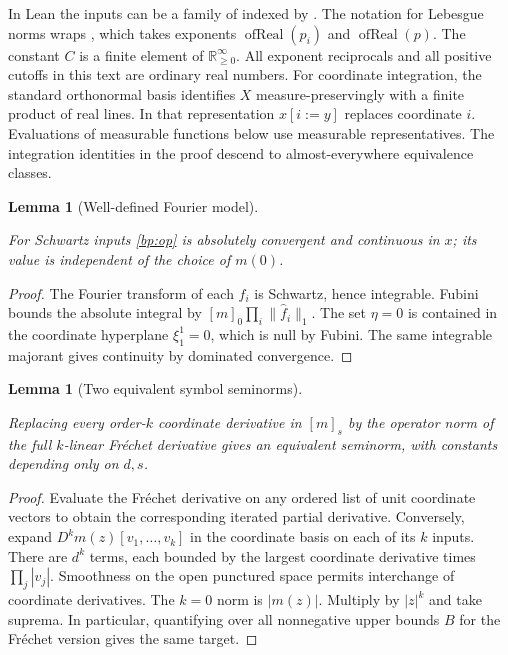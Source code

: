\documentclass[11pt,letterpaper]{article}
\newtheorem{lemma}[theorem]{Lemma}
\theoremstyle{definition}
\newcommand{\norm}[1]{\lVert#1\rVert}
\newcommand{\code}[1]{\texttt{\detokenize{#1}}}
\providecommand{\lean}[1]{}
\begin{document}
In Lean the
inputs can be a family of \code{SchwartzMap} indexed by \code{Fin d}.
The notation for Lebesgue norms wraps \code{eLpNorm}, which takes
exponents \(\operatorname{ofReal}(p_i)\) and
\(\operatorname{ofReal}(p)\). The constant \(C\) is a finite element
of \(\mathbb R_{\ge0}^{\infty}\).
All exponent reciprocals and all positive cutoffs in this text are
ordinary real numbers. For coordinate integration, the standard
orthonormal basis identifies \(X\) measure-preservingly with a finite
product of real lines. In that representation \(x[i:=y]\) replaces
coordinate \(i\). Evaluations of measurable functions below use
measurable representatives. The integration identities in the proof
descend to almost-everywhere equivalence classes.

\begin{lemma}[Well-defined Fourier model]\label{bp:schwartz-Fourier}
\lean{TwistedParaproduct.schwartzFourier}
For Schwartz inputs \eqref{bp:op} is absolutely convergent and
continuous in \(x\); its value is independent of the choice of \(m(0)\).
\end{lemma}
\begin{proof}
The Fourier transform of each \(f_i\) is Schwartz, hence integrable.
Fubini bounds the absolute integral by
\([m]_0\prod_i\norm{\widehat f_i}_1\). The set \(\eta=0\) is contained
in the coordinate hyperplane \(\xi^1_1=0\), which is null by Fubini.
The same integrable majorant gives continuity by dominated convergence.
\end{proof}

\begin{lemma}[Two equivalent symbol seminorms]\label{bp:frechet}
\lean{TwistedParaproduct.frechet}
Replacing every order-\(k\) coordinate derivative in \([m]_s\) by the
operator norm of the full \(k\)-linear Fr\'echet derivative gives an
equivalent seminorm, with constants depending only on \(d,s\).
\end{lemma}
\begin{proof}
Evaluate the Fr\'echet derivative on any ordered list of unit coordinate
vectors to obtain the corresponding iterated partial derivative.
Conversely, expand \(D^km(z)[v_1,\ldots,v_k]\) in the coordinate basis
on each of its \(k\) inputs. There are \(d^k\) terms, each bounded by
the largest coordinate derivative times \(\prod_j|v_j|\).
Smoothness on the open punctured space permits interchange of coordinate
derivatives. The \(k=0\) norm is \(|m(z)|\). Multiply by \(|z|^k\)
and take suprema. In particular, quantifying over all nonnegative
upper bounds \(B\) for the Fr\'echet version gives the same target.
\end{proof}
\end{document}
